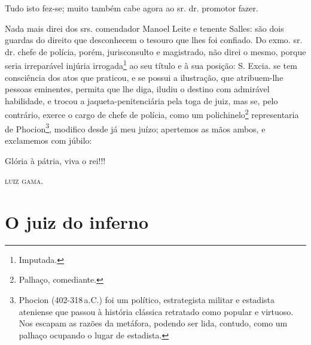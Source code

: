 {Tudo isto fez-se; muito também cabe agora ao sr. dr. promotor fazer.

Nada mais direi dos srs. comendador Manoel Leite e tenente Salles: são
dois guardas do direito que desconhecem o tesouro que lhes foi confiado.
Do exmo. sr. dr. chefe de polícia, porém, jurisconsulto e magistrado,
não direi o mesmo, porque seria irreparável injúria irrogada\footnote{
  Imputada.} ao seu título e à sua posição: S. Excia. se tem consciência
dos atos que praticou, e se possui a ilustração, que atribuem-lhe
pessoas eminentes, permita que lhe diga, iludiu o destino com admirável
habilidade, e trocou a jaqueta-penitenciária pela toga de juiz, mas se,
pelo contrário, exerce o cargo de chefe de polícia, como um
polichinelo\footnote{ Palhaço, comediante.} representaria de
Phocion\footnote{ Phocion (402-318\,a.C.) foi um político,
  estrategista militar e estadista ateniense que passou à história
  clássica retratado como popular e virtuoso. Nos escapam as razões da
  metáfora, podendo ser lida, contudo, como um palhaço ocupando o lugar
  de estadista.}, modifico desde já meu juízo; apertemos as mãos ambos,
e exclamemos com júbilo:

Glória à pátria, viva o rei!!!
\begin{flushright}
\textsc{luiz gama}.

\end{flushright}
\part{O juiz do inferno}

}
